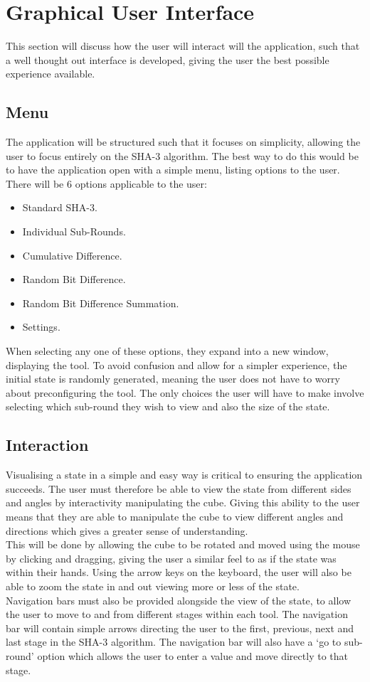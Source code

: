 \section{Graphical User Interface}
This section will discuss how the user will interact will the application, such that a well thought out interface is developed, giving the user the best possible experience available.
\subsection{Menu}
The application will be structured such that it focuses on simplicity, allowing the user to focus entirely on the SHA-3 algorithm. The best way to do this would be to have the application open with a simple menu, listing options to the user.
\vspace{5 mm}\\
There will be 6 options applicable to the user:
\begin{itemize}
\item Standard SHA-3.
\item Individual Sub-Rounds.
\item Cumulative Difference.
\item Random Bit Difference.
\item Random Bit Difference Summation.
\item Settings.
\end{itemize}
When selecting any one of these options, they expand into a new window, displaying the tool. To avoid confusion and allow for a simpler experience, the initial state is randomly generated, meaning the user does not have to worry about preconfiguring the tool. The only choices the user will have to make involve selecting which sub-round they wish to view and also the size of the state.
\subsection{Interaction}
Visualising a state in a simple and easy way is critical to ensuring the application succeeds. The user must therefore be able to view the state from different sides and angles by interactivity manipulating the cube. Giving this ability to the user means that they are able to manipulate the cube to view different angles and directions which gives a greater sense of understanding.
\vspace{5 mm}\\
This will be done by allowing the cube to be rotated and moved using the mouse by clicking and dragging, giving the user a similar feel to as if the state was within their hands. Using the arrow keys on the keyboard, the user will also be able to zoom the state in and out viewing more or less of the state.
\vspace{5 mm}\\
Navigation bars must also be provided alongside the view of the state, to allow the user to move to and from different stages within each tool. The navigation bar will contain simple arrows directing the user to the first, previous, next and last stage in the SHA-3 algorithm. The navigation bar will also have a `go to sub-round' option which allows the user to enter a value and move directly to that stage.

